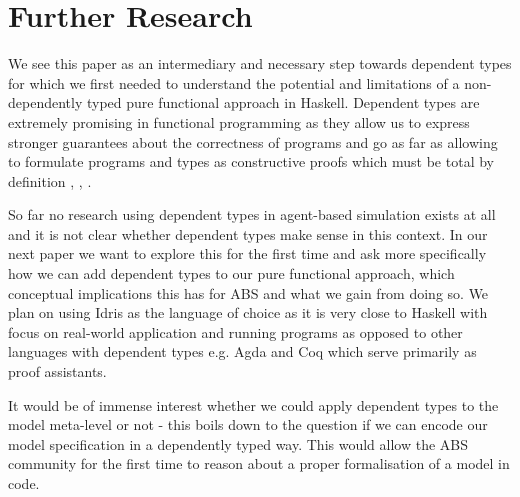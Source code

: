 \section{Further Research}
\label{sec:further_research}
We see this paper as an intermediary and necessary step towards dependent types for which we first needed to understand the potential and limitations of a non-dependently typed pure functional approach in Haskell. Dependent types are extremely promising in functional programming as they allow us to express stronger guarantees about the correctness of programs and go as far as allowing to formulate programs and types as constructive proofs which must be total by definition \cite{thompson_type_1991}, \cite{altenkirch_why_2005}, \cite{altenkirch_pi_2010}.

So far no research using dependent types in agent-based simulation exists at all and it is not clear whether dependent types make sense in this context. In our next paper we want to explore this for the first time and ask more specifically how we can add dependent types to our pure functional approach, which conceptual implications this has for ABS and what we gain from doing so. We plan on using Idris \cite{brady_idris_2013} as the language of choice as it is very close to Haskell with focus on real-world application and running programs as opposed to other languages with dependent types e.g. Agda and Coq which serve primarily as proof assistants.

It would be of immense interest whether we could apply dependent types to the model meta-level or not - this boils down to the question if we can encode our model specification in a dependently typed way. This would allow the ABS community for the first time to reason about a proper formalisation of a model in code.
